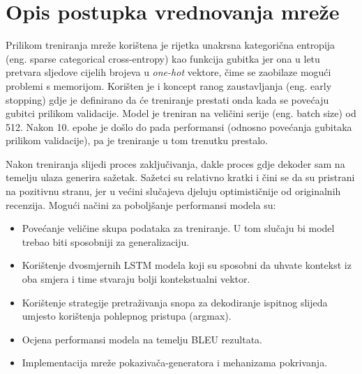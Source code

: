 \documentclass[times, utf8, zavrsni, numeric]{fer}
\begin{document}
\chapter{Opis postupka vrednovanja mreže}
Prilikom treniranja mreže korištena je rijetka unakrsna kategorična entropija (eng. sparse categorical cross-entropy) kao funkcija gubitka jer ona u letu pretvara sljedove cijelih brojeva u \emph{one-hot} vektore, čime se zaobilaze mogući problemi s memorijom.
Korišten je i koncept ranog zaustavljanja (eng. early stopping) gdje je definirano da će treniranje prestati onda kada se povećaju gubitci prilikom validacije.
Model je treniran na veličini serije (eng. batch size) od 512.
Nakon 10. epohe je došlo do pada performansi (odnosno povećanja gubitaka prilikom validacije), pa je treniranje u tom trenutku prestalo.
\par
Nakon treniranja slijedi proces zaključivanja, dakle proces gdje dekoder sam na temelju ulaza generira sažetak.
Sažetci su relativno kratki i čini se da su pristrani na pozitivnu stranu, jer u većini slučajeva djeluju optimističnije od originalnih recenzija.
Mogući načini za poboljšanje performansi modela su:
\begin{itemize}
    \item Povećanje veličine skupa podataka za treniranje. U tom slučaju bi model trebao biti sposobniji za generalizaciju.
    \item Korištenje dvosmjernih LSTM modela koji su sposobni da uhvate kontekst iz oba smjera i time stvaraju bolji kontekstualni vektor.
    \item Korištenje strategije pretraživanja snopa za dekodiranje ispitnog slijeda umjesto korištenja pohlepnog pristupa (argmax).
    \item Ocjena performansi modela na temelju BLEU rezultata.
    \item Implementacija mreže pokazivača-generatora i mehanizama pokrivanja.
\end{itemize}
\end{document}
